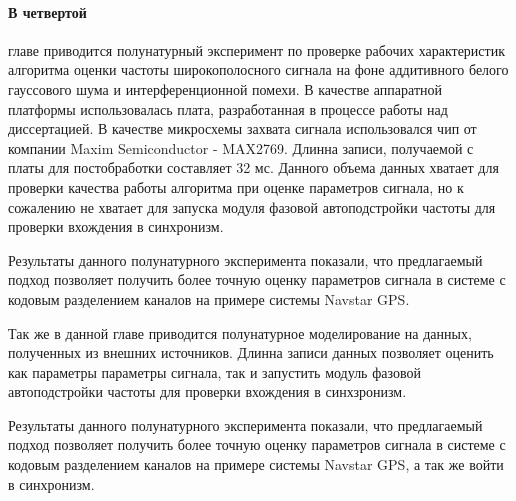\paragraph{В четвертой} главе приводится полунатурный эксперимент по проверке рабочих характеристик алгоритма
оценки частоты широкополосного сигнала на фоне аддитивного белого гауссового шума и интерференционной помехи.
В качестве аппаратной платформы использовалась плата, разработанная в процессе работы над диссертацией.
В качестве микросхемы захвата сигнала использовался чип от компании Maxim Semiconductor - MAX2769. Длинна записи, получаемой
с платы для постобработки составляет 32 мс. Данного объема данных хватает для проверки качества работы алгоритма при оценке
параметров сигнала, но к сожалению не хватает для запуска модуля фазовой автоподстройки частоты для проверки вхождения в синхронизм.

Результаты данного полунатурного эксперимента показали, что предлагаемый подход позволяет получить более точную оценку параметров
сигнала в системе с кодовым разделением каналов на примере системы Navstar GPS.

Так же в данной главе приводится полунатурное моделирование на данных, полученных из внешних источников. Длинна записи данных
позволяет оценить как параметры параметры сигнала, так и запустить модуль фазовой автоподстройки частоты для проверки вхождения в синхзронизм.

Результаты данного полунатурного эксперимента показали, что предлагаемый подход позволяет получить более точную оценку параметров
сигнала в системе с кодовым разделением каналов на примере системы Navstar GPS, а так же войти в синхронизм.

